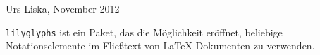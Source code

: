 \documentclass[DIV=15]{scrartcl}
\begin{document}
\section*{\centering\Huge\lilyglyphs}
\begin{flushright}
Urs Liska, November 2012
\end{flushright}
\texttt{lilyglyphs} ist ein Paket, das die Möglichkeit eröffnet, beliebige Notationselemente im Fließtext von \LaTeX-Dokumenten zu verwenden.
\end{document}
